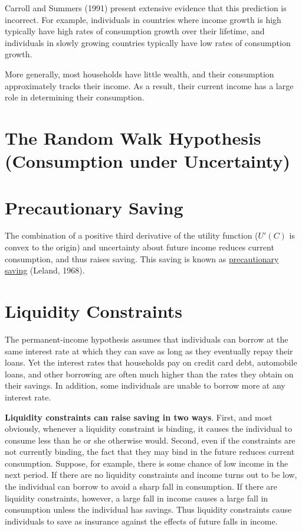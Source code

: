 \documentclass[10pt]{article}
\begin{document}
Carroll and Summers (1991) present extensive evidence that this prediction is incorrect. For example,
individuals in countries where income growth is high typically have high rates of consumption
growth over their lifetime, and individuals in slowly growing countries typically have low rates
of consumption growth.

More generally, most households have little wealth, and their consumption approximately tracks
their income. As a result, their current income has a large role in determining their consumption.




\section{The Random Walk Hypothesis (Consumption under Uncertainty)}





\section{Precautionary Saving}
The combination of a positive third derivative of the utility function ($ U'(C) $ is convex to the
origin) and uncertainty about future income reduces current consumption, and thus raises saving.
This saving is known as {\underline {precautionary saving}} (Leland, 1968).




\section{Liquidity Constraints}

The permanent-income hypothesis assumes that individuals can borrow at the same interest rate at
which they can save as long as they eventually repay their loans.
Yet the interest rates that households pay on credit card debt, automobile loans, and other
borrowing are often much higher than the rates they obtain on their savings. In addition, some 
individuals are unable to borrow more at any interest rate.

{\textbf {Liquidity constraints can raise saving in two ways}}. First, and most obviously, whenever a
liquidity constraint is binding, it causes the individual to consume less than he or she otherwise
would. Second, even if the constraints are not currently binding, the fact that they may bind in the
future reduces current consumption. Suppose, for example, there is some chance of low income
in the next period. If there are no liquidity constraints and income turns out to be low, the 
individual can borrow to avoid a sharp fall in consumption. If there are liquidity constraints, 
however, a large fall in income causes a large fall in consumption unless the individual
has savings. Thus liquidity constraints cause individuals to save as insurance against the
effects of future falls in income.








\end{document}

